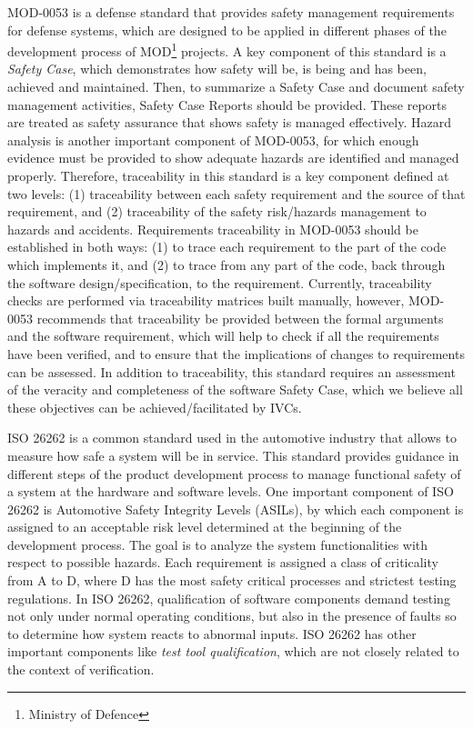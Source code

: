 MOD-0053 \cite{standard2007standard} is a defense standard that provides safety management requirements for defense systems, which are designed to be applied in different phases of the development process of MOD\footnote{Ministry of Defence} projects. A key component of this standard is a
\emph{Safety Case}, which demonstrates how safety will be, is being and has been, achieved and maintained. Then, to summarize a Safety Case and document safety management activities, Safety Case Reports should be provided. These reports are treated as safety assurance that shows safety is managed effectively. Hazard analysis is another important component of MOD-0053, for which enough evidence must be provided to show adequate hazards are identified and managed properly. Therefore, traceability in this standard is a key component defined at two levels: (1) traceability  between each safety
requirement and the source of that requirement, and (2) traceability of the safety
risk/hazards management to hazards and accidents. Requirements traceability in MOD-0053 should be established in both ways: (1) to trace each requirement to the
part of the code which implements it, and (2) to trace from any part of the
code, back through the software design/specification, to the requirement. Currently, traceability checks are performed via traceability matrices built manually, however, MOD-0053 recommends that traceability be provided between the formal arguments and the software
requirement, which will help to check if all the requirements have
been verified, and to ensure that the implications of changes to requirements can be assessed. In addition to traceability, this standard requires an assessment of the veracity and completeness of the software Safety Case, which we believe all these objectives can be achieved/facilitated by IVCs.

ISO 26262 \cite{iso201126262} is a common standard used in the automotive industry that allows to measure how safe a system will be in service. This standard provides guidance in different steps of the product development process to manage functional safety of a system at the hardware and software levels.
One important component of ISO 26262 is Automotive Safety Integrity Levels (ASILs), by which each component is assigned to an acceptable risk level determined at the beginning of the development process. The goal is to analyze the system functionalities with respect to possible hazards. Each requirement is assigned a class of criticality from A to D, where D has the most safety critical processes and strictest testing regulations. In ISO 26262, qualification of software components demand testing not only under normal operating conditions, but also in the presence of faults so to determine how system reacts to abnormal inputs.  ISO 26262 has other important components like \emph{test tool qualification}, which are not closely related to the context of verification.

